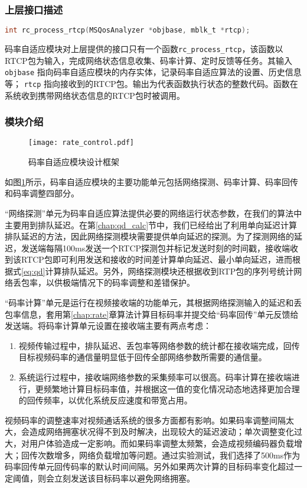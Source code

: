    \subsubsection{上层接口描述}
    \begin{lstlisting}[language=C]
int rc_process_rtcp(MSQosAnalyzer *objbase, mblk_t *rtcp);
    \end{lstlisting}

    码率自适应模块对上层提供的接口只有一个函数\lstinline!rc_process_rtcp!，该函数以RTCP包为输入，完成网络状态信息收集、码率计算、定时反馈等任务。其输入 \lstinline!objbase! 指向码率自适应模块的内存实体，记录码率自适应算法的设置、历史信息等； \lstinline!rtcp! 指向接收到的RTCP包。输出为代表函数执行状态的整数代码。函数在系统收到携带网络状态信息的RTCP包时被调用。

    \subsubsection{模块介绍}
    \begin{figure}[htbp]
      \centering
      \texttt{[image: rate\_control.pdf]}
      \caption{码率自适应模块设计框架}
      \label{fig:rate_control_arch}
    \end{figure}

    如图\ref{fig:rate_control_arch}所示，码率自适应模块的主要功能单元包括网络探测、码率计算、码率回传和码率调整四部分。

    ``网络探测''单元为码率自适应算法提供必要的网络运行状态参数，在我们的算法中主要用到排队延迟。在第\ref{chap:qd_calc}节中，我们已经给出了利用单向延迟计算排队延迟的方法，因此网络探测模块需要提供单向延迟的探测。为了探测网络的延迟，发送端每隔100ms发送一个RTCP探测包并标记发送时刻的时间戳，接收端收到该RTCP包即可利用发送和接收的时间差计算单向延迟、最小单向延迟，进而根据式\ref{eq:qd}计算排队延迟。另外，网络探测模块还根据收到RTP包的序列号统计网络丢包率，以供极端情况下的码率调整和差错保护。

    ``码率计算''单元是运行在视频接收端的功能单元，其根据网络探测输入的延迟和丢包率信息，套用第\ref{chap:rate}章算法计算目标码率并提交给``码率回传''单元反馈给发送端。将码率计算单元设置在接收端主要有两点考虑：
    \begin{enumerate}
        \item 视频传输过程中，排队延迟、丢包率等网络参数的统计都在接收端完成，回传目标视频码率的通信量明显低于回传全部网络参数所需要的通信量。
        \item 系统运行过程中，接收端网络参数的采集频率可以很高。码率计算在接收端进行，更频繁地计算目标码率值，并根据这一值的变化情况动态地选择更加合理的回传频率，以优化系统反应速度和带宽占用。
    \end{enumerate}
    视频码率的调整速率对视频通话系统的很多方面都有影响。如果码率调整间隔太大，会造成网络拥塞状况得不到及时解决，出现较大的延迟波动；单次调整变化过大，对用户体验造成一定影响。而如果码率调整太频繁，会造成视频编码器负载增大；回传次数增多，网络负载增加等问题。通过实验测试，我们选择了500ms作为码率回传单元回传码率的默认时间间隔。另外如果两次计算的目标码率变化超过一定阈值，则会立刻发送该目标码率以避免网络拥塞。


